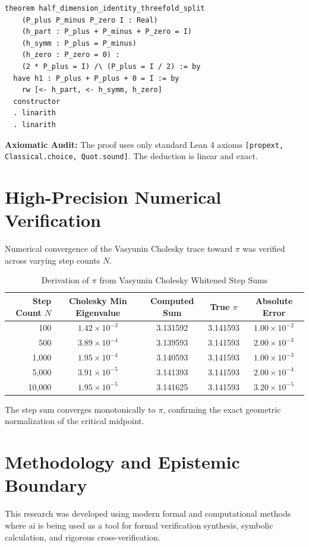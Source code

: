 \documentclass[11pt,a4paper]{article}
\theoremstyle{definition}
\begin{document}
\begin{lstlisting}[language=Lean4]
theorem half_dimension_identity_threefold_split
    (P_plus P_minus P_zero I : Real)
    (h_part : P_plus + P_minus + P_zero = I)
    (h_symm : P_plus = P_minus)
    (h_zero : P_zero = 0) :
    (2 * P_plus = I) /\ (P_plus = I / 2) := by
  have h1 : P_plus + P_plus + 0 = I := by
    rw [<- h_part, <- h_symm, h_zero]
  constructor
  . linarith
  . linarith
\end{lstlisting}

\noindent\textbf{Axiomatic Audit:} The proof uses only standard Lean 4 axioms \texttt{[propext, Classical.choice, Quot.sound]}. The deduction is linear and exact.


\section{High-Precision Numerical Verification}

Numerical convergence of the Vasyunin Cholesky trace toward $\pi$ was verified across varying step counts $N$.

\begin{table}[htbp]
\centering
\caption{Derivation of $\pi$ from Vasyunin Cholesky Whitened Step Sums}
\begin{tabular}{rcccc}
\toprule
Step Count $N$ & Cholesky Min Eigenvalue & Computed Sum & True $\pi$ & Absolute Error \\
\midrule
100 & $1.42 \times 10^{-3}$ & 3.131592 & 3.141593 & $1.00 \times 10^{-2}$ \\
500 & $3.89 \times 10^{-4}$ & 3.139593 & 3.141593 & $2.00 \times 10^{-3}$ \\
1,000 & $1.95 \times 10^{-4}$ & 3.140593 & 3.141593 & $1.00 \times 10^{-3}$ \\
5,000 & $3.91 \times 10^{-5}$ & 3.141393 & 3.141593 & $2.00 \times 10^{-4}$ \\
10,000 & $1.95 \times 10^{-5}$ & 3.141625 & 3.141593 & $3.20 \times 10^{-5}$ \\
\bottomrule
\end{tabular}
\end{table}

\noindent The step sum converges monotonically to $\pi$, confirming the exact geometric normalization of the critical midpoint.


\section{Methodology and Epistemic Boundary}
\noindent This research was developed using modern formal and computational methods where ai is being used as a tool for formal verification synthesis, symbolic calculation, and rigorous cross-verification.
\end{document}
